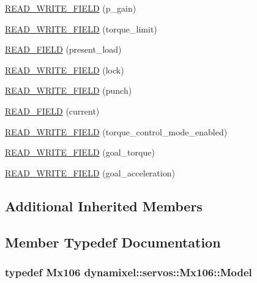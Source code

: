 \begin{DoxyCompactItemize}
\item 
\hyperlink{classdynamixel_1_1servos_1_1_mx106_ab84fd8787641a0468db56c2945b06629}{R\+E\+A\+D\+\_\+\+W\+R\+I\+T\+E\+\_\+\+F\+I\+E\+LD} (p\+\_\+gain)
\item 
\hyperlink{classdynamixel_1_1servos_1_1_mx106_a1092df2d3ba01becca7459aba5e95166}{R\+E\+A\+D\+\_\+\+W\+R\+I\+T\+E\+\_\+\+F\+I\+E\+LD} (torque\+\_\+limit)
\item 
\hyperlink{classdynamixel_1_1servos_1_1_mx106_a16da36a01eb7725338214d6487fc04b4}{R\+E\+A\+D\+\_\+\+F\+I\+E\+LD} (present\+\_\+load)
\item 
\hyperlink{classdynamixel_1_1servos_1_1_mx106_addf6ed651e50ee69e996bfb34f9afaff}{R\+E\+A\+D\+\_\+\+W\+R\+I\+T\+E\+\_\+\+F\+I\+E\+LD} (lock)
\item 
\hyperlink{classdynamixel_1_1servos_1_1_mx106_ab9562577fd77646481c250d9074ab321}{R\+E\+A\+D\+\_\+\+W\+R\+I\+T\+E\+\_\+\+F\+I\+E\+LD} (punch)
\item 
\hyperlink{classdynamixel_1_1servos_1_1_mx106_a5ff7aa5082ce04646225faf46456f792}{R\+E\+A\+D\+\_\+\+F\+I\+E\+LD} (current)
\item 
\hyperlink{classdynamixel_1_1servos_1_1_mx106_ad6c794a0da24424f94cc338dd8459d51}{R\+E\+A\+D\+\_\+\+W\+R\+I\+T\+E\+\_\+\+F\+I\+E\+LD} (torque\+\_\+control\+\_\+mode\+\_\+enabled)
\item 
\hyperlink{classdynamixel_1_1servos_1_1_mx106_a527973a61a7abd15cf204cc5eb5dc381}{R\+E\+A\+D\+\_\+\+W\+R\+I\+T\+E\+\_\+\+F\+I\+E\+LD} (goal\+\_\+torque)
\item 
\hyperlink{classdynamixel_1_1servos_1_1_mx106_a3034e35636cbdf4f80f3437ddc3429d9}{R\+E\+A\+D\+\_\+\+W\+R\+I\+T\+E\+\_\+\+F\+I\+E\+LD} (goal\+\_\+acceleration)
\end{DoxyCompactItemize}
\subsection*{Additional Inherited Members}


\subsection{Member Typedef Documentation}
\subsubsection[{\texorpdfstring{Model}{Model}}]{\setlength{\rightskip}{0pt plus 5cm}typedef {\bf Mx106} {\bf dynamixel\+::servos\+::\+Mx106\+::\+Model}}\hypertarget{classdynamixel_1_1servos_1_1_mx106_abdde9ccd67391ac3df136edee77f9534}{}\label{classdynamixel_1_1servos_1_1_mx106_abdde9ccd67391ac3df136edee77f9534}



